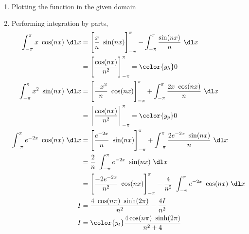 \begin{enumerate}
    \item Plotting the function in the given domain
          \begin{figure}[H]
              \centering
          \end{figure}

    \item Performing integration by parts,
          \begin{align}
              \int_{-\pi}^{\pi} x\ \cos(nx)\ \dl x
                & = \Bigg[\frac{x}{n}\ \sin(nx)\Bigg]_{-\pi}^{\pi}
              - \int_{-\pi}^{\pi} \frac{\sin(nx)}{n}\ \dl x                         \\
                & = \Bigg[ \frac{\cos(nx)}{n^2} \Bigg]_{-\pi}^{\pi} = \color{y_h} 0 \\
              \int_{-\pi}^{\pi} x^2\ \sin(nx)\ \dl x
                & = \Bigg[\frac{-x^2}{n}\ \cos(nx)\Bigg]_{-\pi}^{\pi}
              + \int_{-\pi}^{\pi} \frac{2x\ \cos(nx)}{n}\ \dl x                     \\
                & = \Bigg[ \frac{\cos(nx)}{n^2} \Bigg]_{-\pi}^{\pi} = \color{y_p} 0 \\
              \int_{-\pi}^{\pi} e^{-2x}\ \cos(nx)\ \dl x
                & = \Bigg[\frac{e^{-2x}}{n}\ \sin(nx)\Bigg]_{-\pi}^{\pi}
              + \int_{-\pi}^{\pi} \frac{2e^{-2x}\ \sin(nx)}{n}\ \dl x               \\
                & = \frac{2}{n}\ \int_{-\pi}^{\pi} e^{-2x}\ \sin(nx)\ \dl x         \\
                & = \Bigg[ \frac{-2e^{-2x}}{n^2}\ \cos(nx) \Bigg]_{-\pi}^{\pi}
              - \frac{4}{n^2}\ \int_{-\pi}^{\pi} e^{-2x}\ \cos(nx)\ \dl x           \\
              I & = \frac{4\ \cos(n\pi)\ \sinh(2\pi)}{n^2} - \frac{4I}{n^2}         \\
              I & = \color{y_t}\frac{4\cos(n\pi)\ \sinh(2\pi)}{n^2 + 4}
          \end{align}


\end{enumerate}
